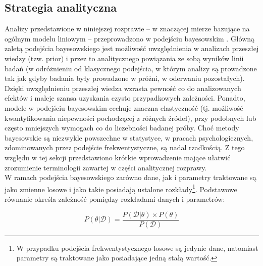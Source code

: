 \documentclass[man]{apa6}
\begin{document}
\subsection{Strategia analityczna}
Analizy przedstawione w niniejszej rozprawie -- w znaczącej mierze bazujące na ogólnym modelu liniowym -- przeprowadzono w podejściu bayesowskim \parencite[zob. np.,][]{gelman2014bayesian,gill2014bayesian, kruschke2014doing}. Główną zaletą podejścia bayesowskiego jest możliwość uwzględnienia w analizach przeszłej wiedzy (tzw. prior) i przez to analitycznego powiązania ze sobą wyników linii badań (w odróżnieniu od klasycznego podejścia, w którym analizy są prowadzone tak jak gdyby badania były prowadzone w próżni, w oderwaniu pozostałych). Dzięki uwzględnieniu przeszłej wiedza wzrasta pewność co do analizowanych efektów i maleje szansa uzyskania czysto przypadkowych zależności. Ponadto, modele w podejściu bayesowskim cechuje znaczna elastyczność (tj. możliwość kwantyfikowania niepewności pochodzącej z różnych źródeł), przy podobnych lub często mniejszych wymogach co do liczebności badanej próby. Choć metody bayesowskie są niezwykle powszechne w statystyce, w pracach psychologicznych, zdominowanych przez podejście frekwentystyczne, są nadal rzadkością. Z tego względu w tej sekcji przedstawiono krótkie wprowadzenie mające ułatwić zrozumienie terminologii zawartej w części analitycznej rozprawy.\\

W ramach podejścia bayesowskiego zarówno dane, jak i parametry traktowane są jako zmienne losowe i jako takie posiadają ustalone rozkłady\footnote{W przypadku podejścia frekwentystycznego losowe są jedynie dane, natomiast parametry są traktowane jako posiadające jedną stałą wartość.}. Podstawowe równanie określa zależność pomiędzy rozkładami danych i parametrów:

\begin{equation}\label{eq:bayes}
    P(\theta | \mathcal{D}) =
    \frac{P(\mathcal{D} | \theta)\times P(\theta)}
    {P(\mathcal{D})}
\end{equation}
\end{document}
